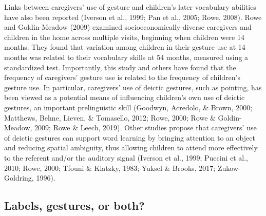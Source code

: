 \documentclass[
  english,
  man,floatsintext]{apa6}
\begin{document}
Links between caregivers' use of gesture and children's later vocabulary abilities have also been reported (Iverson et al., 1999; Pan et al., 2005; Rowe, 2008). Rowe and Goldin-Meadow (2009) examined socioeconomically-diverse caregivers and children in the home across multiple visits, beginning when children were 14 months. They found that variation among children in their gesture use at 14 months was related to their vocabulary skills at 54 months, measured using a standardized test. Importantly, this study and others have found that the frequency of caregivers' gesture use is related to the frequency of children's gesture use. In particular, caregivers' use of deictic gestures, such as pointing, has been viewed as a potential means of influencing children's own use of deictic gestures, an important prelinguistic skill (Goodwyn, Acredolo, \& Brown, 2000; Matthews, Behne, Lieven, \& Tomasello, 2012; Rowe, 2000; Rowe \& Goldin-Meadow, 2009; Rowe \& Leech, 2019). Other studies propose that caregivers' use of deictic gestures can support word learning by bringing attention to an object and reducing spatial ambiguity, thus allowing children to attend more effectively to the referent and/or the auditory signal (Iverson et al., 1999; Puccini et al., 2010; Rowe, 2000; Tfouni \& Klatzky, 1983; Yuksel \& Brooks, 2017; Zukow-Goldring, 1996).

\hypertarget{labels-gestures-or-both}{%
\subsection{Labels, gestures, or both?}\label{labels-gestures-or-both}}
\end{document}
